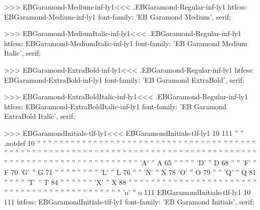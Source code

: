 >>>
\<EBGaramond-Medium-inf-ly1\><<<
.EBGaramond-Regular-inf-ly1
htfcss:  EBGaramond-Medium-inf-ly1  font-family: 'EB Garamond Medium', serif;

>>>
\<EBGaramond-MediumItalic-inf-ly1\><<<
.EBGaramond-Regular-inf-ly1
htfcss:  EBGaramond-MediumItalic-inf-ly1  font-family: 'EB Garamond Medium Italic', serif;

>>>
\<EBGaramond-ExtraBold-inf-ly1\><<<
.EBGaramond-Regular-inf-ly1
htfcss:  EBGaramond-ExtraBold-inf-ly1  font-family: 'EB Garamond ExtraBold', serif;

>>>
\<EBGaramond-ExtraBoldItalic-inf-ly1\><<<
.EBGaramond-Regular-inf-ly1
htfcss:  EBGaramond-ExtraBoldItalic-inf-ly1  font-family: 'EB Garamond ExtraBold Italic', serif;

>>>
\<EBGaramondInitials-tlf-ly1\><<<
EBGaramondInitials-tlf-ly1 10 111
'' '' .notdef 10
'' ''  
'' ''  
'' ''  
'' ''  
'' ''  
'' ''  
'' ''  
'' ''  
'' ''  
'' ''  
'' ''  
'' ''  
'' ''  
'' ''  
'' ''  
'' ''  
'' ''  
'' ''  
'' ''  
'' ''  
'' ''  
'' ''  
'' ''  
'' ''  
'' ''  
'' ''  
'' ''  
'' ''  
'' ''  
'' ''  
'' ''  
'' ''  
'' ''  
'' ''  
'' ''  
'' ''  
'' ''  
'' ''  
'' ''  
'' ''  
'' ''  
'' ''  
'' ''  
'' ''  
'' ''  
'' ''  
'' ''  
'' ''  
'' ''  
'' ''  
'' ''  
'' ''  
'' ''  
'' ''  
'A' '' A 65
'' ''  
'' ''  
'D' '' D 68
'' ''  
'F' '' F 70
'G' '' G 71
'' ''  
'' ''  
'' ''  
'' ''  
'L' '' L 76
'' ''  
'N' '' N 78
'O' '' O 79
'' ''  
'Q' '' Q 81
'' ''  
'' ''  
'T' '' T 84
'' ''  
'' ''  
'' ''  
'X' '' X 88
'' ''  
'' ''  
'' ''  
'' ''  
'' ''  
'' ''  
'' ''  
'' ''  
'' ''  
'' ''  
'' ''  
'' ''  
'' ''  
'' ''  
'' ''  
'' ''  
'' ''  
'' ''  
'' ''  
'' ''  
'' ''  
'' ''  
'o' '' o 111
EBGaramondInitials-tlf-ly1 10 111
htfcss:  EBGaramondInitials-tlf-ly1  font-family: 'EB Garamond Initials', serif;

